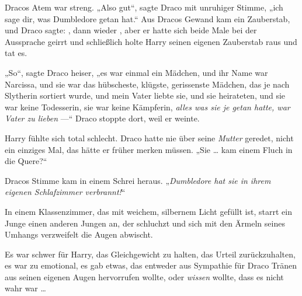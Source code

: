 Dracos Atem war streng.
„Also gut“, sagte Draco mit unruhiger Stimme, „ich sage dir, was Dumbledore getan hat.“ Aus Dracos Gewand kam ein Zauberstab, und Draco sagte: , dann wieder , aber er hatte sich beide Male bei der Aussprache geirrt und schließlich holte Harry seinen eigenen Zauberstab raus und tat es.

„So“, sagte Draco heiser, „es war einmal ein Mädchen, und ihr Name war Narcissa, und sie war das hübscheste, klügste, gerissenste Mädchen, das je nach Slytherin sortiert wurde, und mein Vater liebte sie, und sie heirateten, und sie war keine Todesserin, sie war keine Kämpferin, \emph{alles was sie je getan hatte, war Vater zu lieben} —“ Draco stoppte dort, weil er weinte.

Harry fühlte sich total schlecht. Draco hatte nie über seine \emph{Mutter} geredet, nicht ein einziges Mal, das hätte er früher merken müssen.
„Sie … kam einem Fluch in die Quere?“

Dracos Stimme kam in einem Schrei heraus.
„\emph{Dumbledore hat sie in ihrem eigenen Schlafzimmer verbrannt!}“

\later

In einem Klassenzimmer, das mit weichem, silbernem Licht gefüllt ist, starrt ein Junge einen anderen Jungen an, der schluchzt und sich mit den Ärmeln seines Umhangs verzweifelt die Augen abwischt.

Es war schwer für Harry, das Gleichgewicht zu halten, das Urteil zurückzuhalten, es war zu emotional, es gab etwas, das entweder aus Sympathie für Draco Tränen aus seinen eigenen Augen hervorrufen wollte, oder \emph{wissen} wollte, dass es nicht wahr war …

